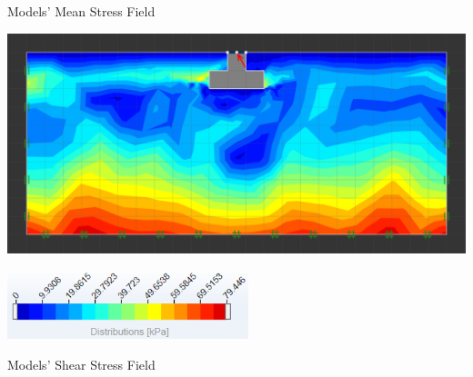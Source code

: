 \documentclass{article}
\begin{document}
\begin{par}
\begin{center}
Models' Mean Stress Field
\end{center}
\end{par}


\vspace{1em}
\begin{par}
\begin{center}
\includegraphics[width=\maxwidth{70.54691419969895em}]{image_5}
\end{center}
\end{par}

\begin{par}
\begin{center}
\includegraphics[width=7cm]{image_6}
\end{center}
\end{par}

\begin{par}
\begin{center}
Models' Shear Stress Field
\end{center}
\end{par}


\vspace{1em}

\vspace{1em}

\vspace{1em}

\vspace{1em}

\vspace{1em}

\vspace{1em}
\end{document}
